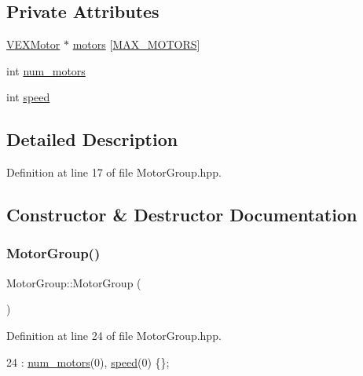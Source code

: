 \subsection*{Private Attributes}
\begin{DoxyCompactItemize}
\item 
\hyperlink{class_v_e_x_motor}{V\+E\+X\+Motor} $\ast$ \hyperlink{class_motor_group_a8f2d6b4622a775ee0c5e95aafb83a1bb}{motors} \mbox{[}\hyperlink{_motor_group_8hpp_a40dfd7fdfce455ce507bf3fed368c2ed}{M\+A\+X\+\_\+\+M\+O\+T\+O\+RS}\mbox{]}
\item 
int \hyperlink{class_motor_group_a93ffa3ad9fc210e6d2ed29b50dbf7292}{num\+\_\+motors}
\item 
int \hyperlink{class_motor_group_a79ddfc90443f2f919d88f66e51494d97}{speed}
\end{DoxyCompactItemize}


\subsection{Detailed Description}


Definition at line 17 of file Motor\+Group.\+hpp.



\subsection{Constructor \& Destructor Documentation}
\mbox{\label{class_motor_group_abb8e3e077cdc061d321162f846647aeb}} 
\subsubsection{\texorpdfstring{Motor\+Group()}{MotorGroup()}}
{\footnotesize\ttfamily Motor\+Group\+::\+Motor\+Group (\begin{DoxyParamCaption}{ }\end{DoxyParamCaption})\hspace{0.3cm}{\ttfamily [inline]}}



Definition at line 24 of file Motor\+Group.\+hpp.


\begin{DoxyCode}
24 : \hyperlink{class_motor_group_a93ffa3ad9fc210e6d2ed29b50dbf7292}{num\_motors}(0), \hyperlink{class_motor_group_a79ddfc90443f2f919d88f66e51494d97}{speed}(0) \{\};
\end{DoxyCode}
\mbox{\label{class_motor_group_aff77909a09cada0bf7742de4c91ba630}} 
